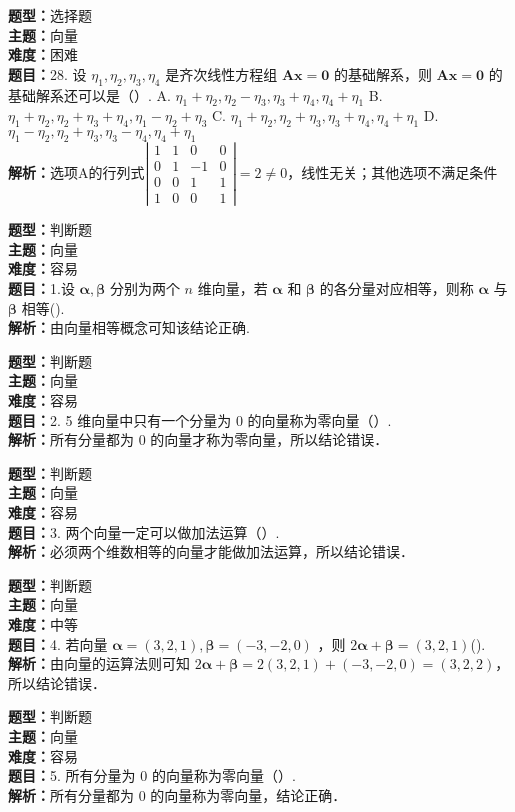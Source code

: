 \documentclass{ctexart}
\newenvironment{question}[5]{%
	\noindent\textbf{题型：}#1\\
	\textbf{主题：}#2\\
	\textbf{难度：}#3\\
	\textbf{题目：}#4\\
	\textbf{解析：}#5\\
	\vspace{1em}
}{}
\begin{document}
	\begin{question}
		{选择题}
		{向量}
		{困难}
		{28. 设 \(\eta_1, \eta_2, \eta_3, \eta_4\) 是齐次线性方程组 \(\mathbf{A}\mathbf{x}=\mathbf{0}\) 的基础解系，则 \(\mathbf{A}\mathbf{x}=\mathbf{0}\) 的基础解系还可以是（）. 
			A. \(\eta_1+\eta_2, \eta_2-\eta_3, \eta_3+\eta_4, \eta_4+\eta_1\)
			B. \(\eta_1+\eta_2, \eta_2+\eta_3+\eta_4, \eta_1-\eta_2+\eta_3\)
			C. \(\eta_1+\eta_2, \eta_2+\eta_3, \eta_3+\eta_4, \eta_4+\eta_1\)
			D. \(\eta_1-\eta_2, \eta_2+\eta_3, \eta_3-\eta_4, \eta_4+\eta_1\)}
		{选项A的行列式\(\left|\begin{array}{cccc}1 & 1 & 0 & 0 \\ 0 & 1 & -1 & 0 \\ 0 & 0 & 1 & 1 \\ 1 & 0 & 0 & 1\end{array}\right|=2 \neq 0\)，线性无关；其他选项不满足条件}
	\end{question}
	
	
	
	
	\begin{question}
		{判断题}
		{向量}
		{容易}
		{1.设 \(\boldsymbol{\alpha}, \boldsymbol{\beta}\) 分别为两个 \(n\) 维向量，若 \(\boldsymbol{\alpha}\) 和 \(\boldsymbol{\beta}\) 的各分量对应相等，则称 \(\boldsymbol{\alpha}\) 与 \(\boldsymbol{\beta}\) 相等(\qquad). }
		{由向量相等概念可知该结论正确. }
	\end{question}
	
	
	\begin{question}
		{判断题}
		{向量}
		{容易}
		{2. 5 维向量中只有一个分量为 0 的向量称为零向量（）. }
		{所有分量都为 0 的向量才称为零向量，所以结论错误．}
	\end{question}
	
	\begin{question}
		{判断题}
		{向量}
		{容易}
		{3. 两个向量一定可以做加法运算（）. }
		{必须两个维数相等的向量才能做加法运算，所以结论错误．}
	\end{question}
	
	\begin{question}
		{判断题}
		{向量}
		{中等}
		{4. 若向量 \(\boldsymbol{\alpha}=(3,2,1), \boldsymbol{\beta}=(-3,-2,0)\) ，则 \(2 \boldsymbol{\alpha}+\boldsymbol{\beta}=(3,2,1)\)(\qquad). }
		{由向量的运算法则可知 \(2\boldsymbol{\alpha}+\boldsymbol{\beta}=2(3,2,1)+(-3,-2,0)=(3,2,2)\)，所以结论错误．}
	\end{question}
	
	\begin{question}
		{判断题}
		{向量}
		{容易}
		{5. 所有分量为 0 的向量称为零向量（）. }
		{所有分量都为 0 的向量称为零向量，结论正确．}
	\end{question}
	
\end{document}
